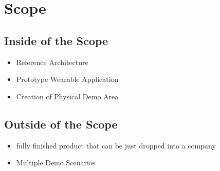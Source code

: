 \chapter{Scope}\label{cha:scope}

\section{Inside of the Scope}
\begin{itemize}
	\item Reference Architecture
	\item Prototype Wearable Application
	\item Creation of Physical Demo Area
\end{itemize}

\section{Outside of the Scope}
\begin{itemize}
	\item fully finished product that can be just dropped into a company
	\item Multiple Demo Scenarios
\end{itemize}